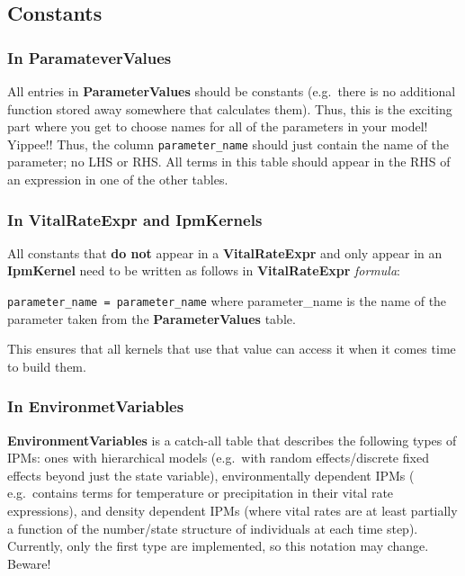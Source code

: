 \documentclass[]{article}
\begin{document}
\subsection{Constants}\label{constants}

\subsubsection{In ParamateverValues}\label{in-paramatevervalues}

All entries in \textbf{ParameterValues} should be constants (e.g.~there
is no additional function stored away somewhere that calculates them).
Thus, this is the exciting part where you get to choose names for all of
the parameters in your model! Yippee!! Thus, the column
\texttt{parameter\_name} should just contain the name of the parameter;
no LHS or RHS. All terms in this table should appear in the RHS of an
expression in one of the other tables.

\subsubsection{In VitalRateExpr and
IpmKernels}\label{in-vitalrateexpr-and-ipmkernels}

All constants that \textbf{do not} appear in a \textbf{VitalRateExpr}
and only appear in an \textbf{IpmKernel} need to be written as follows
in \textbf{VitalRateExpr} \emph{formula}:

\texttt{parameter\_name\ =\ parameter\_name} where parameter\_name is
the name of the parameter taken from the \textbf{ParameterValues} table.

This ensures that all kernels that use that value can access it when it
comes time to build them.

\subsubsection{In EnvironmetVariables}\label{in-environmetvariables}

\textbf{EnvironmentVariables} is a catch-all table that describes the
following types of IPMs: ones with hierarchical models (e.g.~with random
effects/discrete fixed effects beyond just the state variable),
environmentally dependent IPMs ( e.g.~contains terms for temperature or
precipitation in their vital rate expressions), and density dependent
IPMs (where vital rates are at least partially a function of the
number/state structure of individuals at each time step). Currently,
only the first type are implemented, so this notation may change.
Beware!
\end{document}
